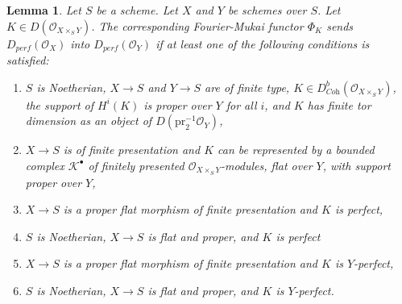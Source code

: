 \documentclass{stacks-project}
\theoremstyle{plain}
\newtheorem{lemma}[subsection]{Lemma}
\theoremstyle{definition}
\theoremstyle{remark}
\numberwithin{equation}{subsection}
\begin{document}
\begin{lemma}
\label{lemma-fourier-mukai}
Let $S$ be a scheme. Let $X$ and $Y$ be schemes over $S$.
Let $K \in D(\mathcal{O}_{X \times_S Y})$.
The corresponding Fourier-Mukai functor $\Phi_K$ sends
$D_{perf}(\mathcal{O}_X)$ into $D_{perf}(\mathcal{O}_Y)$ if at least
one of the following conditions is satisfied:
\begin{enumerate}
\item $S$ is Noetherian, $X \to S$ and $Y \to S$ are of finite type,
$K \in D^b_{\textit{Coh}}(\mathcal{O}_{X \times_S Y})$, the support of $H^i(K)$
is proper over $Y$ for all $i$, and $K$ has finite tor dimension
as an object of $D(\text{pr}_2^{-1}\mathcal{O}_Y)$,
\item $X \to S$ is of finite presentation and $K$ can be represented
by a bounded complex $\mathcal{K}^\bullet$ of finitely presented
$\mathcal{O}_{X \times_S Y}$-modules, flat over $Y$, with support
proper over $Y$,
\item $X \to S$ is a proper flat morphism of finite presentation
and $K$ is perfect,
\item $S$ is Noetherian, $X \to S$ is flat and proper, and $K$ is perfect
\item $X \to S$ is a proper flat morphism of finite presentation
and $K$ is $Y$-perfect,
\item $S$ is Noetherian, $X \to S$ is flat and proper, and $K$ is
$Y$-perfect.
\end{enumerate}
\end{lemma}
\end{document}
